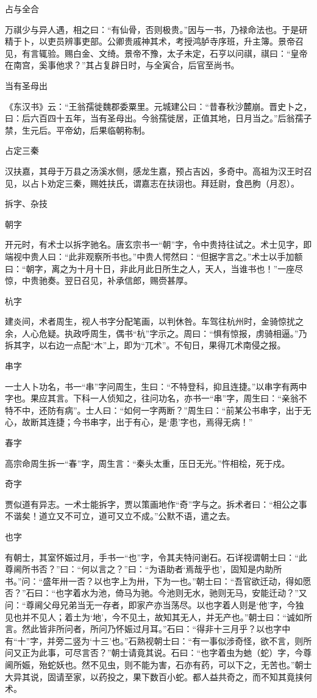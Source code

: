 \documentclass[a4paper,12pt,UTF8,twoside]{ctexbook}
\begin{document}
    占与全合
    
    万祺少与异人遇，相之曰：“有仙骨，否则极贵。”因与一书，乃禄命法也。于是研精于卜，以吏员辨事吏部。公卿贵戚神其术，考授鸿胪寺序班，升主簿。景帝召见，有言辄验。赐白金、文绮。景帝不豫，太子未定，石亨以问祺，祺曰：“皇帝在南宫，奚事他求？”其占复辟日时，与全寅合，后官至尚书。
    
    当有圣母出
    
    《东汉书》云：“王翁孺徙魏郡委粟里。元城建公曰：“昔春秋沙麓崩。晋史卜之，曰：后六百四十五年，当有圣母出。今翁孺徙居，正值其地，日月当之。”后翁孺子禁，生元后。平帝幼，后果临朝称制。
    
    占定三秦
    
    汉扶嘉，其母于万县之汤溪水侧，感龙生嘉，预占吉凶，多奇中。高祖为汉王时召见，以占卜劝定三秦，赐姓扶氏，谓嘉志在扶诩也。拜廷尉，食邑朐（月忍）。
    
    拆字、杂技
    
    朝字
    
    开元时，有术士以拆字驰名。唐玄宗书一“朝”字，令中贵持往试之。术士见字，即端视中贵人曰：“此非观察所书也。”中贵人愕然曰：“但据字言之。”术士以手加额曰：“朝字，离之为十月十日，非此月此日所生之人，天人，当谁书也！”一座尽惊，中贵驰奏。翌日召见，补承信郎，赐赍甚厚。
    
    杭字
    
    建炎间，术者周生，视人书字分配笔画，以判休咎。车驾往杭州时，金骑惊扰之余，人心危疑。执政呼周生，偶书“杭”字示之。周曰：“惧有惊报，虏骑相逼。”乃拆其字，以右边一点配“木”上，即为“兀术”。不旬日，果得兀术南侵之报。
    
    串字
    
    一士人卜功名，书一“串”字问周生，生曰：“不特登科，抑且连捷。”以串字有两中字也。果应其言。下科一人侦知之，往问功名，亦书一“串”字，周生曰：“亲翁不特不中，还防有病”。士人曰：“如何一字两断？”周生曰：“前某公书串字，出于无心，故断其连捷；今书串字，出于有心，是‘患’字也，焉得无病！”
    
    春字
    
    高宗命周生拆一“春”字，周生言：“秦头太重，压日无光。”忤相桧，死于戍。
    
    奇字
    
    贾似道有异志。一术士能拆字，贾以策画地作“奇”字与之。拆术者曰：“相公之事不谐矣！道立又不可立，道可又立不成。”公默不语，遣之去。
    
    也字
    
    有朝士，其室怀娠过月，手书一“也”字，令其夫特问谢石。石详视谓朝士曰：“此尊阃所书否？”曰：“何以言之？”曰：“为语助者‘焉哉乎也’，固知是内助所书。”问：“盛年卅一否？以也字上为卅，下为一也。”朝士曰：“吾官欲迁动，得如愿否？”石曰：“也字着水为池，倚马为驰。今池则无水，驰则无马，安能迁动？”又问：“尊阃父母兄弟当无一存者，即家产亦当荡尽。以也字着人则是‘他’字，今独见也并不见人；着土为‘地’，今不见土，故知其无人，并无产也。”朝士曰：“诚如所言。然此皆非所问者，所问乃怀娠过月耳。”石曰：“得非十三月乎？以也字中有“十”字，并旁二竖为‘十三’也。”石熟视朝士曰：“有一事似涉奇怪，欲不言，则所问又正为此事，可尽言否？”朝士请竟其说。石曰：“也字着虫为虵（蛇）字，今尊阃所娠，殆蛇妖也。然不见虫，则不能为害，石亦有药，可以下之，无苦也。”朝士大异其说，固请至家，以药投之，果下数百小蛇。都人益共奇之，而不知其竟挟何术。
    
\end{document}
